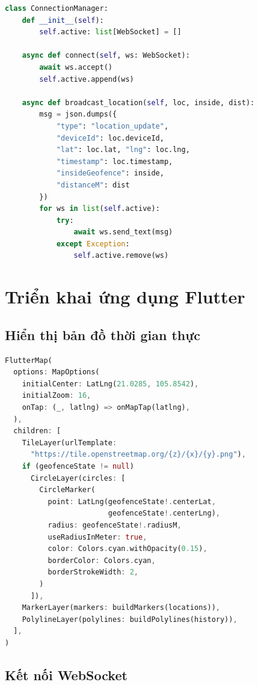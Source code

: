 \documentclass[13pt, a4paper]{report}
\begin{document}
\begin{lstlisting}[language=python, caption=ws/connection\_manager.py]
class ConnectionManager:
    def __init__(self):
        self.active: list[WebSocket] = []

    async def connect(self, ws: WebSocket):
        await ws.accept()
        self.active.append(ws)

    async def broadcast_location(self, loc, inside, dist):
        msg = json.dumps({
            "type": "location_update",
            "deviceId": loc.deviceId,
            "lat": loc.lat, "lng": loc.lng,
            "timestamp": loc.timestamp,
            "insideGeofence": inside,
            "distanceM": dist
        })
        for ws in list(self.active):
            try:
                await ws.send_text(msg)
            except Exception:
                self.active.remove(ws)
\end{lstlisting}

\section{Triển khai ứng dụng Flutter}

\subsection{Hiển thị bản đồ thời gian thực}

\begin{lstlisting}[language=dart, caption=Widget bản đồ với marker và geofence circle]
FlutterMap(
  options: MapOptions(
    initialCenter: LatLng(21.0285, 105.8542),
    initialZoom: 16,
    onTap: (_, latlng) => onMapTap(latlng),
  ),
  children: [
    TileLayer(urlTemplate:
      "https://tile.openstreetmap.org/{z}/{x}/{y}.png"),
    if (geofenceState != null)
      CircleLayer(circles: [
        CircleMarker(
          point: LatLng(geofenceState!.centerLat,
                        geofenceState!.centerLng),
          radius: geofenceState!.radiusM,
          useRadiusInMeter: true,
          color: Colors.cyan.withOpacity(0.15),
          borderColor: Colors.cyan,
          borderStrokeWidth: 2,
        )
      ]),
    MarkerLayer(markers: buildMarkers(locations)),
    PolylineLayer(polylines: buildPolylines(history)),
  ],
)
\end{lstlisting}

\subsection{Kết nối WebSocket}
\end{document}
